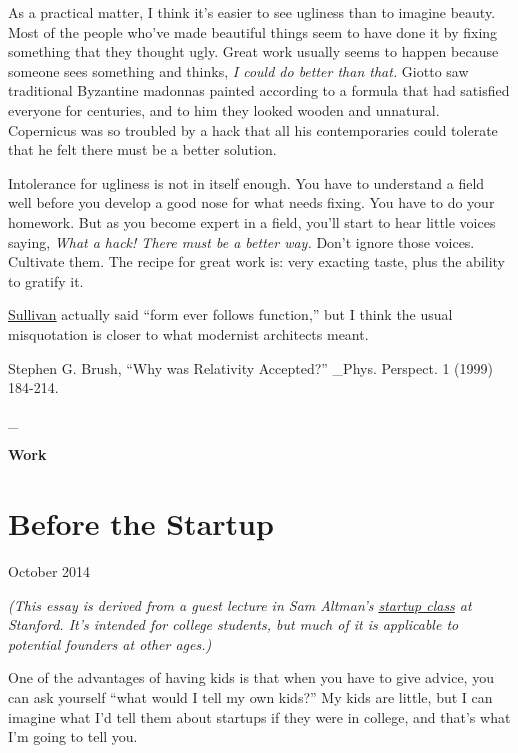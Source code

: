\documentclass[12pt]{book}
\begin{document}
As a practical matter, I think it's easier to see ugliness than to
imagine beauty. Most of the people who've made beautiful things seem to
have done it by fixing something that they thought ugly. Great work
usually seems to happen because someone sees something and thinks,
\emph{I could do better than that.} Giotto saw traditional Byzantine
madonnas painted according to a formula that had satisfied everyone for
centuries, and to him they looked wooden and unnatural. Copernicus was
so troubled by a hack that all his contemporaries could tolerate that he
felt there must be a better solution.

Intolerance for ugliness is not in itself enough. You have to understand
a field well before you develop a good nose for what needs fixing. You
have to do your homework. But as you become expert in a field, you'll
start to hear little voices saying, \emph{What a hack! There must be a
better way.} Don't ignore those voices. Cultivate them. The recipe for
great work is: very exacting taste, plus the ability to gratify it.


\href{https://sep.turbifycdn.com/ty/cdn/paulgraham/sullivan.html?t=1688221954&}{Sullivan}
actually said ``form ever follows function,'' but I think the usual
misquotation is closer to what modernist architects meant.

Stephen G. Brush, ``Why was Relativity Accepted?'' \_Phys. Perspect. 1
(1999) 184-214.

\_

\clearpage
\thispagestyle{empty}
\vspace*{\fill}
\begin{center}
{\LARGE\bfseries Work}
\end{center}
\vspace*{\fill}
\clearpage

\chapter{Before the Startup}

October 2014

\emph{(This essay is derived from a guest lecture in Sam Altman's
\href{http://startupclass.samaltman.com/}{startup class} at Stanford.
It's intended for college students, but much of it is applicable to
potential founders at other ages.)}

One of the advantages of having kids is that when you have to give
advice, you can ask yourself ``what would I tell my own kids?'' My kids
are little, but I can imagine what I'd tell them about startups if they
were in college, and that's what I'm going to tell you.
\end{document}
